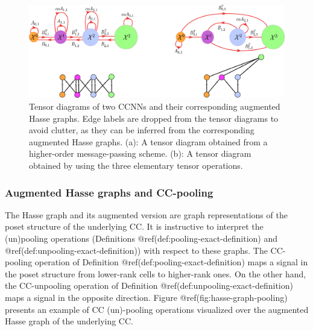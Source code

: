 \documentclass[
  12pt,
]{krantz}
\begin{document}
\begin{figure}

{\centering \includegraphics{figures/augmented_hasse_graph_examples} 

}

\caption{Tensor diagrams of two CCNNs and their corresponding augmented Hasse graphs. Edge labels are dropped from the tensor diagrams to avoid clutter, as they can be inferred from the corresponding augmented Hasse graphs. (a): A tensor diagram obtained from a higher-order message-passing scheme. (b): A tensor diagram obtained by using the three elementary tensor operations.}\label{fig:hasse-diagram-examples}
\end{figure}

\subsubsection{Augmented Hasse graphs and
CC-pooling}\label{augmented-hasse-graphs-and-cc-pooling}

The Hasse graph and its augmented version are graph representations of
the poset structure of the underlying CC. It is instructive to interpret
the (un)pooling operations (Definitions
@ref(def:pooling-exact-definition) and
@ref(def:unpooling-exact-definition)) with respect to these graphs. The
CC-pooling operation of Definition @ref(def:pooling-exact-definition)
maps a signal in the poset structure from lower-rank cells to
higher-rank ones. On the other hand, the CC-unpooling operation of
Definition @ref(def:unpooling-exact-definition) maps a signal in the
opposite direction. Figure @ref(fig:hasse-graph-pooling) presents an
example of CC (un)-pooling operations visualized over the augmented
Hasse graph of the underlying CC.
\end{document}
